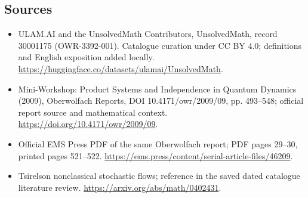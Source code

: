 \documentclass[11pt]{article}
\begin{document}
\subsection{Sources}
\begin{itemize}
\item[\hypertarget{source:30001175:1}{S1}] ULAM.AI and the UnsolvedMath Contributors, UnsolvedMath, record 30001175 (OWR-3392-001). Catalogue curation under CC BY 4.0; definitions and English exposition added locally.
\url{https://huggingface.co/datasets/ulamai/UnsolvedMath}.
\item[\hypertarget{source:30001175:2}{S2}] Mini-Workshop: Product Systems and Independence in Quantum Dynamics (2009), Oberwolfach Reports, DOI 10.4171/owr/2009/09, pp. 493--548; official report source and mathematical context.
\url{https://doi.org/10.4171/owr/2009/09}.
\item[\hypertarget{source:30001175:3}{S3}] Official EMS Press PDF of the same Oberwolfach report; PDF pages 29--30, printed pages 521--522.
\url{https://ems.press/content/serial-article-files/46209}.
\item[\hypertarget{source:30001175:4}{S4}] Tsirelson nonclassical stochastic flows; reference in the saved dated catalogue literature review.
\url{https://arxiv.org/abs/math/0402431}.
\end{itemize}
\label{end:30001175}
\end{document}
